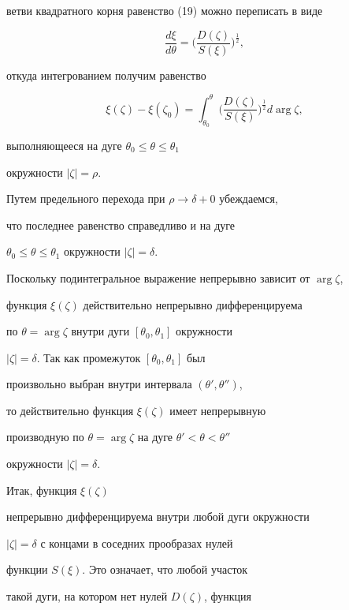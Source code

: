 \begin{pf}
ветви квадратного корня равенство (19) можно переписать в виде


\begin{equation}


\frac{d\xi}{d\theta}=\bigg(\frac{D(\zeta)}{S(\xi)}\bigg)^{\frac{1}{2}},


\end{equation}


откуда интегрованием получим равенство


$$


\xi(\zeta)-\xi(\zeta_{0})=\int_{\theta_{0}}^{\theta}


\bigg (\frac{D(\zeta)}{S(\xi)}\bigg )^{\frac{1}{2}}d\arg\zeta,


$$


выполняющееся на дуге $\theta_{0}\le\theta\le\theta_{1}$


окружности $|\zeta|=\rho$.


Путем предельного перехода при $\rho\to\delta+0$ убеждаемся,


что последнее равенство справедливо и на дуге 


$\theta_{0}\le\theta\le\theta_{1}$ окружности $|\zeta|=\delta$. 


Поскольку подинтегральное выражение непрерывно зависит от $\arg\zeta$,


функция $\xi(\zeta)$ действительно непрерывно дифференцируема


по $\theta=\arg\zeta$ внутри дуги $[\theta_{0},\theta_{1}]$ окружности


$|\zeta|=\delta$. Так как промежуток $[\theta_{0},\theta_{1}]$ был 


произвольно выбран внутри интервала $(\theta',\theta'')$, 


то действительно функция $\xi(\zeta)$ имеет непрерывную


производную по $\theta=\arg\zeta$ на дуге $\theta'<\theta<\theta''$


окружности $|\zeta|=\delta$. 





Итак, функция $\xi(\zeta)$


непрерывно дифференцируема внутри любой дуги окружности 


$|\zeta|=\delta$ с концами в соседних прообразах нулей


функции $S(\xi)$. Это означает, что любой участок 


такой дуги, на котором нет нулей $D(\zeta)$, функция 



\end{pf}
